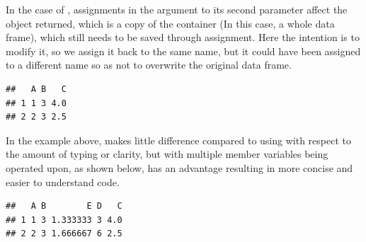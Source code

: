 \documentclass[krantz2]{krantz}\usepackage{knitr}
\begin{document}
\begin{explainbox}
In the case of , assignments in the argument to its second parameter affect the object returned, which is a copy of the container (In this case, a whole data frame), which still needs to be saved through assignment. Here the intention is to modify it, so we assign it back to the same name, but it could have been assigned to a different name so as not to overwrite the original data frame.

\begin{knitrout}\footnotesize
{}\color{fgcolor}\begin{kframe}
\begin{alltt}
\hlopt{$} \hlkwb{<-} 
 \hlkwb{<-}  \hlkwb{<-}  \hlopt{+}  \hlopt{/} 
 \hlstd{)}
\end{alltt}
\begin{verbatim}
##   A B   C
## 1 1 3 4.0
## 2 2 3 2.5
\end{verbatim}
\end{kframe}
\end{knitrout}
In the example above,  makes little difference compared to using  with respect to the amount of typing or clarity, but with multiple member variables being operated upon, as shown below,  has an advantage resulting in more concise and easier to understand code.

\begin{knitrout}\footnotesize
{}\color{fgcolor}\begin{kframe}
\begin{alltt}
\hlopt{$} \hlkwb{<-} 
 \hlkwb{<-} 
                            \hlkwb{<-}  \hlopt{+}  \hlopt{/} 
                             \hlkwb{<-}  \hlopt{*} 
                             \hlkwb{<-}  \hlopt{/}  \hlopt{+} \hlstd{\}}
                           \hlstd{)}
 \hlstd{)}
\end{alltt}
\begin{verbatim}
##   A B        E D   C
## 1 1 3 1.333333 3 4.0
## 2 2 3 1.666667 6 2.5
\end{verbatim}
\end{kframe}
\end{knitrout}


\end{explainbox}
\end{document}
